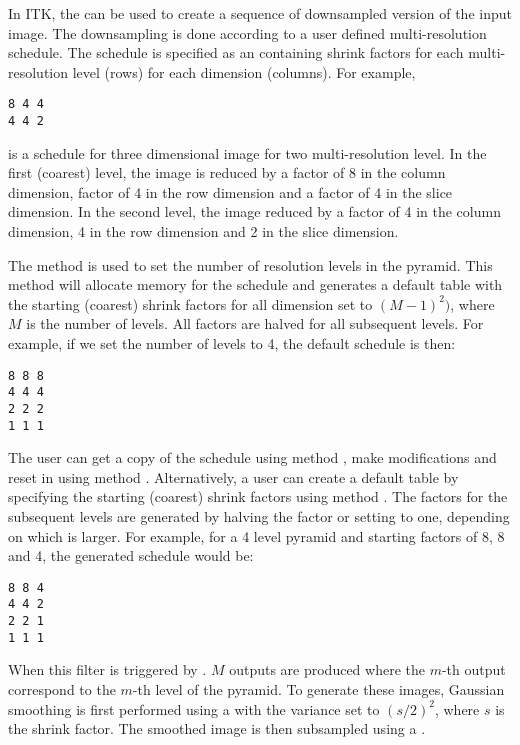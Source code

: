 

In ITK, the  can be used to create a
sequence of downsampled version of the input image.  The downsampling is done
according to a user defined multi-resolution schedule. The schedule is
specified as an  containing shrink factors for each
multi-resolution level (rows) for each dimension (columns). For example,

\begin{verbatim}
8 4 4
4 4 2
\end{verbatim}

is a schedule for three dimensional image for two multi-resolution level. 
In the first (coarest) level, the image is reduced by a factor of 8 
in the column dimension, factor of 4 in the row dimension and a factor
of 4 in the slice dimension. In the second level, the image reduced
by a factor of 4 in the column dimension, 4 in the row dimension and
2 in the slice dimension.


The method  is used to set the number of
resolution levels in the pyramid. This method will allocate memory
for the schedule and generates a default table with the starting
(coarest) shrink factors for all dimension set to $(M-1)^2)$, 
where $M$ is the number of levels. All factors are halved for
all subsequent levels. For example, if we set the number of levels
to 4, the default schedule is then:

\begin{verbatim}
8 8 8
4 4 4
2 2 2
1 1 1
\end{verbatim}


The user can get a copy of the schedule using method ,
make modifications and reset in using method .
Alternatively, a user can create a default table by specifying the
starting (coarest) shrink factors using method 
. The factors for the subsequent
levels are generated by halving the factor or setting to one, 
depending on which is larger. For example, for a 4 level pyramid
and starting factors of 8, 8 and 4, the generated schedule would be:

\begin{verbatim}
8 8 4
4 4 2
2 2 1
1 1 1
\end{verbatim}

When this filter is triggered by . $M$ outputs are produced
where the $m$-th output correspond to the $m$-th level of the pyramid.
To generate these images, Gaussian smoothing is first performed using a
 with the variance set to $(s/2)^2$,
where $s$ is the shrink factor. The smoothed image is then subsampled using
a .
